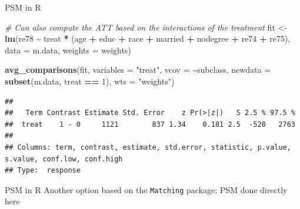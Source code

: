\documentclass[
  ignorenonframetext,
  aspectratio=169, handout]{beamer}
\newenvironment{Shaded}{\begin{snugshade}}{\end{snugshade}}
\newcommand{\AttributeTok}[1]{\textcolor[rgb]{0.13,0.29,0.53}{#1}}
\newcommand{\CommentTok}[1]{\textcolor[rgb]{0.56,0.35,0.01}{\textit{#1}}}
\newcommand{\ConstantTok}[1]{\textcolor[rgb]{0.56,0.35,0.01}{#1}}
\newcommand{\DecValTok}[1]{\textcolor[rgb]{0.00,0.00,0.81}{#1}}
\newcommand{\FunctionTok}[1]{\textcolor[rgb]{0.13,0.29,0.53}{\textbf{#1}}}
\newcommand{\NormalTok}[1]{#1}
\newcommand{\OtherTok}[1]{\textcolor[rgb]{0.56,0.35,0.01}{#1}}
\newcommand{\SpecialCharTok}[1]{\textcolor[rgb]{0.81,0.36,0.00}{\textbf{#1}}}
\newcommand{\StringTok}[1]{\textcolor[rgb]{0.31,0.60,0.02}{#1}}
\begin{document}
\begin{frame}[fragile]{PSM in R}
\protect\hypertarget{psm-in-r-5}{}
\footnotesize

\begin{Shaded}
\begin{Highlighting}[]
\CommentTok{\# Can also compute the ATT based on the interactions of the treatment}
\NormalTok{fit }\OtherTok{\textless{}{-}} \FunctionTok{lm}\NormalTok{(re78 }\SpecialCharTok{\textasciitilde{}}\NormalTok{ treat }\SpecialCharTok{*}\NormalTok{ (age }\SpecialCharTok{+}\NormalTok{ educ }\SpecialCharTok{+}\NormalTok{ race }\SpecialCharTok{+}\NormalTok{ married }\SpecialCharTok{+}\NormalTok{ nodegree }\SpecialCharTok{+} 
\NormalTok{             re74 }\SpecialCharTok{+}\NormalTok{ re75), }\AttributeTok{data =}\NormalTok{ m.data, }\AttributeTok{weights =}\NormalTok{ weights)}

\FunctionTok{avg\_comparisons}\NormalTok{(fit,}
                \AttributeTok{variables =} \StringTok{"treat"}\NormalTok{,}
                \AttributeTok{vcov =} \SpecialCharTok{\textasciitilde{}}\NormalTok{subclass,}
                \AttributeTok{newdata =} \FunctionTok{subset}\NormalTok{(m.data, treat }\SpecialCharTok{==} \DecValTok{1}\NormalTok{),}
                \AttributeTok{wts =} \StringTok{"weights"}\NormalTok{)}
\end{Highlighting}
\end{Shaded}

\begin{verbatim}
## 
##   Term Contrast Estimate Std. Error    z Pr(>|z|)   S 2.5 % 97.5 %
##  treat    1 - 0     1121        837 1.34    0.181 2.5  -520   2763
## 
## Columns: term, contrast, estimate, std.error, statistic, p.value, s.value, conf.low, conf.high 
## Type:  response
\end{verbatim}
\end{frame}

\begin{frame}[fragile]{PSM in R}
\protect\hypertarget{psm-in-r-6}{}
Another option based on the \texttt{Matching} package; PSM done directly
here \footnotesize

\begin{Shaded}
\end{Shaded}
\end{frame}
\end{document}
